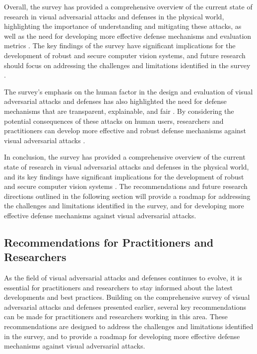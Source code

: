 \documentclass[11pt]{article}
\begin{document}
Overall, the survey has provided a comprehensive overview of the current state of research in visual adversarial attacks and defenses in the physical world, highlighting the importance of understanding and mitigating these attacks, as well as the need for developing more effective defense mechanisms and evaluation metrics \cite{ref153}. The key findings of the survey have significant implications for the development of robust and secure computer vision systems, and future research should focus on addressing the challenges and limitations identified in the survey \cite{ref141}.

The survey's emphasis on the human factor in the design and evaluation of visual adversarial attacks and defenses has also highlighted the need for defense mechanisms that are transparent, explainable, and fair \cite{ref154}. By considering the potential consequences of these attacks on human users, researchers and practitioners can develop more effective and robust defense mechanisms against visual adversarial attacks \cite{ref16}.

In conclusion, the survey has provided a comprehensive overview of the current state of research in visual adversarial attacks and defenses in the physical world, and its key findings have significant implications for the development of robust and secure computer vision systems \cite{ref3}. The recommendations and future research directions outlined in the following section will provide a roadmap for addressing the challenges and limitations identified in the survey, and for developing more effective defense mechanisms against visual adversarial attacks.

\subsection{Recommendations for Practitioners and Researchers}

As the field of visual adversarial attacks and defenses continues to evolve, it is essential for practitioners and researchers to stay informed about the latest developments and best practices. Building on the comprehensive survey of visual adversarial attacks and defenses presented earlier, several key recommendations can be made for practitioners and researchers working in this area. These recommendations are designed to address the challenges and limitations identified in the survey, and to provide a roadmap for developing more effective defense mechanisms against visual adversarial attacks.
\end{document}

